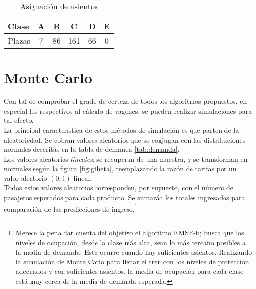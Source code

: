 \documentclass[12pt]{article}
\begin{document}
\begin{table}[!htp]\centering

\begin{tabular}{lccccc}\toprule
Clase &A &B &C &D &E \\\midrule
Plazas &7 &86 &161 &66 &0 \\
\bottomrule
\end{tabular}

\caption{Asignación de asientos}
\end{table}























\section{Monte Carlo}

Con tal de comprobar el grado de certeza de todos los algoritmos propuestos, en especial los respectivos al cálculo de vagones, se pueden realizar simulaciones para tal efecto.\\

La principal característica de estos métodos de simulación es que parten de la aleatoriedad. Se cobran valores aleatorios que se conjugan con las distribuciones normales descritas en la tabla de demanda \ref{tab:demanda}.\\

Los valores aleatorios \emph{lineales}, se recuperan de una muestra, y se transforman en normales según la figura \ref{fig:gtheta}, reemplazando la razón de tarifas por un valor aleatorio $(0,1)$ lineal.\\

Todos estos valores aleatorios corresponden, por supuesto, con el número de pasajeros esperados para cada producto. Se sumarán los totales ingresados para comparación de las predicciones de ingreso.\footnote{Merece la pena dar cuenta del objetivo el algoritmo EMSR-b; busca que los niveles de ocupación, desde la clase más alta, sean lo más cercano posibles a la media de demanda. Esto ocurre cuando hay suficientes asientos. Realizando la simulación de Monte Carlo para llenar el tren con los niveles de protección adecuados y con suficientes asientos, la media de ocupación para cada clase está muy cerca de la media de demanda esperada.}\\
\end{document}
